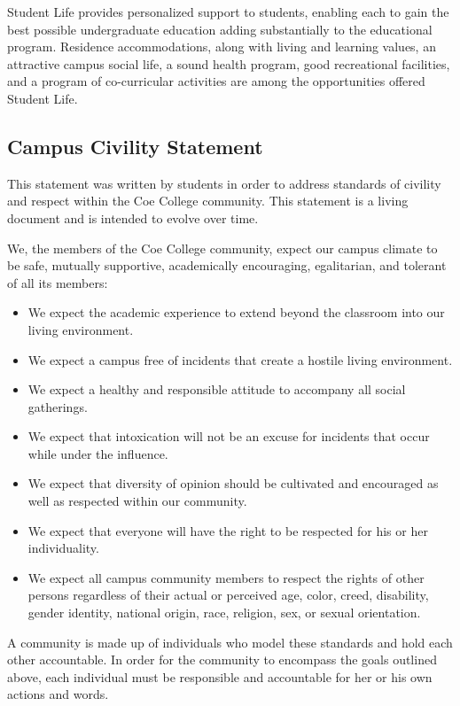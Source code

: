 \documentclass[
  letterpaper,
]{scrbook}
\providecommand{\tightlist}{%
  \setlength{\itemsep}{0pt}\setlength{\parskip}{0pt}}
\begin{document}
Student Life provides personalized support to students, enabling each to
gain the best possible undergraduate education adding substantially to
the educational program. Residence accommodations, along with living and
learning values, an attractive campus social life, a sound health
program, good recreational facilities, and a program of co-curricular
activities are among the opportunities offered Student Life.

\subsection{Campus Civility Statement}\label{campus-civility-statement}

This statement was written by students in order to address standards of
civility and respect within the Coe College community. This statement is
a living document and is intended to evolve over time.

We, the members of the Coe College community, expect our campus climate
to be safe, mutually supportive, academically encouraging, egalitarian,
and tolerant of all its members:

\begin{itemize}
\tightlist
\item
  We expect the academic experience to extend beyond the classroom into
  our living environment.
\item
  We expect a campus free of incidents that create a hostile living
  environment.
\item
  We expect a healthy and responsible attitude to accompany all social
  gatherings.
\item
  We expect that intoxication will not be an excuse for incidents that
  occur while under the influence.
\item
  We expect that diversity of opinion should be cultivated and
  encouraged as well as respected within our community.
\item
  We expect that everyone will have the right to be respected for his or
  her individuality.
\item
  We expect all campus community members to respect the rights of other
  persons regardless of their actual or perceived age, color, creed,
  disability, gender identity, national origin, race, religion, sex, or
  sexual orientation.
\end{itemize}

A community is made up of individuals who model these standards and hold
each other accountable. In order for the community to encompass the
goals outlined above, each individual must be responsible and
accountable for her or his own actions and words.
\end{document}
